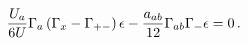 \begin{equation}
 {U_a \over 6U} \Gamma _a\left(\Gamma_{x}-\Gamma_{+-}\right) \epsilon
 -{a_{ab}\over 12}\Gamma_{ab}\Gamma _-\epsilon =0\,.
 \label{SUSYx}
\end{equation}


